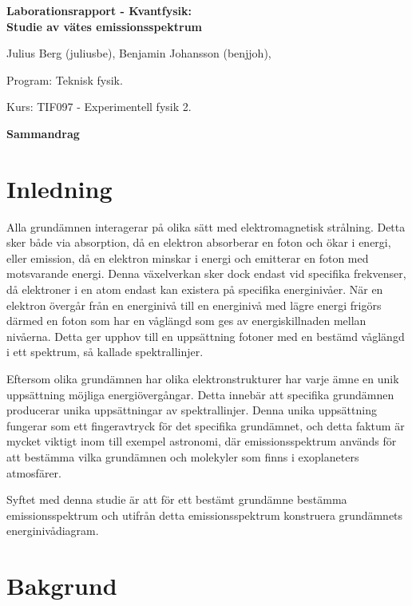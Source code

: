\documentclass[12pt, a4paper]{article}
\begin{document}
\thispagestyle{empty}
\begin{center}
{\huge\bf Laborationsrapport - Kvantfysik:\\}
{\Large\bf Studie av vätes emissionsspektrum
}
\end{center}
\vspace{1.0cm}
\begin{center}
Julius Berg (juliusbe), Benjamin Johansson (benjjoh), \par
Program: Teknisk fysik. \par
Kurs: TIF097 - Experimentell fysik 2.
\end{center}
\vspace{1.0cm}
\centerline{\bf Sammandrag}
 
\newpage
\tableofcontents
\newpage

\section{Inledning}

Alla grundämnen interagerar på olika sätt med elektromagnetisk strålning.
Detta sker både via absorption, då en elektron absorberar en foton och ökar i energi, eller emission, 
då en elektron minskar i energi och emitterar en foton med motsvarande energi\cite{rana_quantum_electronics}.
Denna växelverkan sker dock endast vid specifika frekvenser, då elektroner i en atom endast kan existera
på specifika energinivåer.
När en elektron övergår från en energinivå till en energinivå med lägre energi frigörs därmed en foton som har en våglängd som ges av energiskillnaden mellan nivåerna.
Detta ger upphov till en uppsättning fotoner med en bestämd våglängd i ett spektrum, så kallade spektrallinjer\cite{TKACHENKO2006107}.

Eftersom olika grundämnen har olika elektronstrukturer har varje ämne en unik uppsättning möjliga energiövergångar.
Detta innebär att specifika grundämnen producerar unika uppsättningar av spektrallinjer.
Denna unika uppsättning fungerar som ett fingeravtryck för det specifika grundämnet, och detta faktum är mycket viktigt inom till exempel astronomi, 
där emissionsspektrum används för att bestämma vilka grundämnen och molekyler som finns i exoplaneters atmosfärer\cite{tessenyi_molecular_detectability}.

Syftet med denna studie är att för ett bestämt grundämne bestämma emissionsspektrum och utifrån detta emissionsspektrum konstruera grundämnets energinivådiagram.
\section{Bakgrund}
\end{document}
